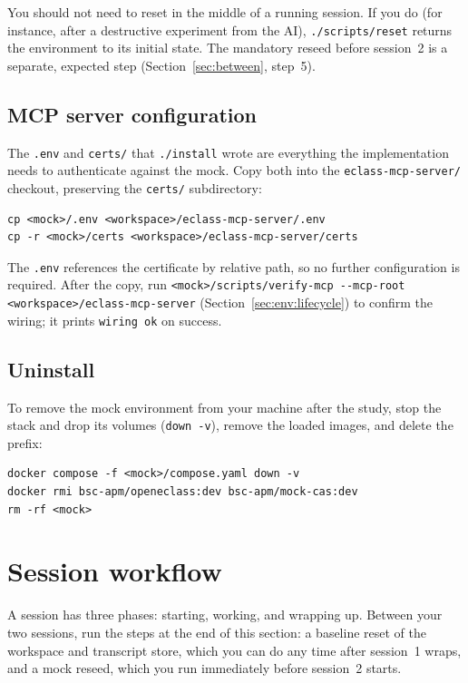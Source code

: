 \documentclass[11pt, a4paper]{article}
\begin{document}
You should not need to reset in the middle of a running session. If you do (for instance, after a destructive experiment from the AI), \texttt{./scripts/reset} returns the environment to its initial state. The mandatory reseed before session~2 is a separate, expected step (Section~\ref{sec:between}, step~5).

\subsection{MCP server configuration}
\label{sec:env:config}

The \texttt{.env} and \texttt{certs/} that \texttt{./install} wrote are everything the implementation needs to authenticate against the mock. Copy both into the \texttt{eclass-mcp-server/} checkout, preserving the \texttt{certs/} subdirectory:

\begin{verbatim}
cp <mock>/.env <workspace>/eclass-mcp-server/.env
cp -r <mock>/certs <workspace>/eclass-mcp-server/certs
\end{verbatim}

The \texttt{.env} references the certificate by relative path, so no further configuration is required. After the copy, run \texttt{<mock>/scripts/verify-mcp -{}-mcp-root <workspace>/eclass-mcp-server} (Section~\ref{sec:env:lifecycle}) to confirm the wiring; it prints \texttt{wiring ok} on success.

\subsection{Uninstall}
\label{sec:env:uninstall}

To remove the mock environment from your machine after the study, stop the stack and drop its volumes (\texttt{down -v}), remove the loaded images, and delete the prefix:

\begin{verbatim}
docker compose -f <mock>/compose.yaml down -v
docker rmi bsc-apm/openeclass:dev bsc-apm/mock-cas:dev
rm -rf <mock>
\end{verbatim}

\section{Session workflow}
\label{sec:workflow}

A session has three phases: starting, working, and wrapping up. Between your two sessions, run the steps at the end of this section: a baseline reset of the workspace and transcript store, which you can do any time after session~1 wraps, and a mock reseed, which you run immediately before session~2 starts.
\end{document}
